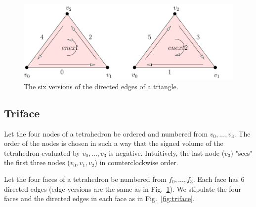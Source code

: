 \begin{figure}
  \centering
  \includegraphics[width=1.0\textwidth]{../figs/face-versions}
\caption{The six versions of the directed edges of a triangle.}
\label{fig:edge-versions}
\end{figure}

\subsection{Triface}

Let the four nodes of a tetrahedron be ordered and numbered from $v_0, ..., v_3$. The order of the nodes is chosen in such a way that the signed volume of the tetrahedron evaluated by $v_0, ..., v_3$ is negative. Intuitively, the last node ($v_3$) "sees" the first three nodes ($v_0, v_1, v_2$) in counterclockwise order. 

Let the four faces of a tetrahedron be numbered from $f_0, ..., f_3$.  Each face has $6$ directed edges (edge versions are the same as in Fig.~\ref{fig:edge-versions}). We stipulate the four faces and the directed edges in each face as in Fig.~\ref{fig:triface}.

